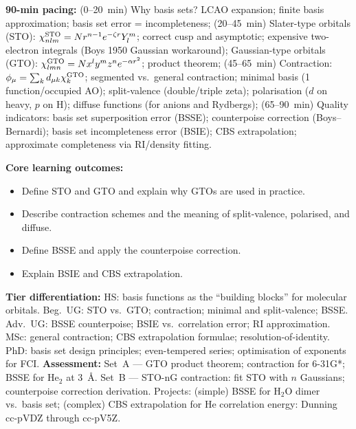 \documentclass[11pt,a4paper]{article}
\begin{document}
\begin{tcolorbox}[chembox, title={Module~III.2 / L13: Basis Sets I --- Types of Functions}]
\textbf{90-min pacing:} (0--20~min) Why basis sets? LCAO expansion; finite basis approximation; basis set error = incompleteness; (20--45~min) Slater-type orbitals (STO): $\chi^{\rm STO}_{nlm}=Nr^{n-1}e^{-\zeta r}Y_l^m$; correct cusp and asymptotic; expensive two-electron integrals (Boys 1950 Gaussian workaround); Gaussian-type orbitals (GTO): $\chi^{\rm GTO}_{lmn}=Nx^ly^mz^ne^{-\alpha r^2}$; product theorem; (45--65~min) Contraction: $\phi_\mu=\sum_k d_{\mu k}\chi_k^{\rm GTO}$; segmented vs.\ general contraction; minimal basis (1 function/occupied AO); split-valence (double/triple zeta); polarisation ($d$ on heavy, $p$ on H); diffuse functions (for anions and Rydbergs); (65--90~min) Quality indicators: basis set superposition error (BSSE); counterpoise correction (Boys--Bernardi); basis set incompleteness error (BSIE); CBS extrapolation; approximate completeness via RI/density fitting.

\medskip\textbf{Core learning outcomes:}
\begin{itemize}[leftmargin=1.4em,topsep=2pt,itemsep=1pt]
  \item Define STO and GTO and explain why GTOs are used in practice.
  \item Describe contraction schemes and the meaning of split-valence, polarised, and diffuse.
  \item Define BSSE and apply the counterpoise correction.
  \item Explain BSIE and CBS extrapolation.
\end{itemize}
\medskip\textbf{Tier differentiation:}
HS: basis functions as the ``building blocks'' for molecular orbitals.
Beg.\ UG: STO vs.\ GTO; contraction; minimal and split-valence; BSSE.
Adv.\ UG: BSSE counterpoise; BSIE vs.\ correlation error; RI approximation.
MSc: general contraction; CBS extrapolation formulae; resolution-of-identity.
PhD: basis set design principles; even-tempered series; optimisation of exponents for FCI.
\medskip\textbf{Assessment:}
Set~A --- GTO product theorem; contraction for 6-31G*; BSSE for He$_2$ at 3~\AA.
Set~B --- STO-nG contraction: fit STO with $n$ Gaussians; counterpoise correction derivation.
Projects: (simple) BSSE for H$_2$O dimer vs.\ basis set; (complex) CBS extrapolation for He correlation energy: Dunning cc-pVDZ through cc-pV5Z.
\end{tcolorbox}

\medskip
\end{document}
